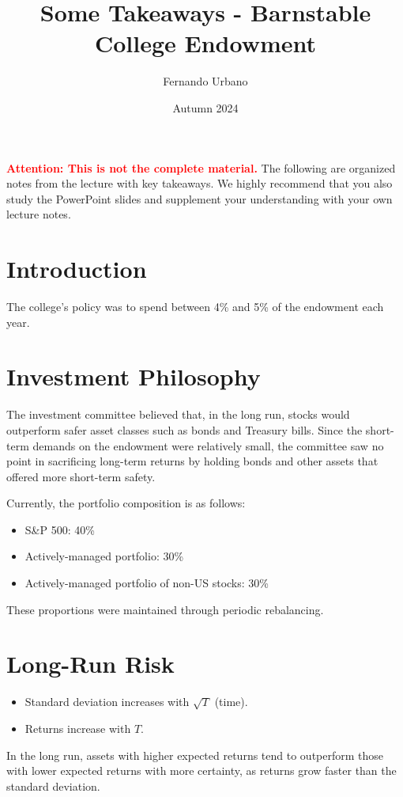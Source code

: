 \documentclass{article}
\title{Some Takeaways - Barnstable College Endowment}
\author{Fernando Urbano}
\date{Autumn 2024}
\newcommand{\redbold}[1]{\textbf{\textcolor{red}{#1}}}
\begin{document}
\maketitle

\redbold{Attention: This is not the complete material.} The following are organized notes from the lecture with key takeaways. We highly recommend that you also study the PowerPoint slides and supplement your understanding with your own lecture notes.

\section{Introduction}
The college's policy was to spend between 4\% and 5\% of the endowment each year.

\section{Investment Philosophy}
The investment committee believed that, in the long run, stocks would outperform safer asset classes such as bonds and Treasury bills. Since the short-term demands on the endowment were relatively small, the committee saw no point in sacrificing long-term returns by holding bonds and other assets that offered more short-term safety.

Currently, the portfolio composition is as follows:
\begin{itemize}
    \item S\&P 500: 40\%
    \item Actively-managed portfolio: 30\%
    \item Actively-managed portfolio of non-US stocks: 30\%
\end{itemize}

These proportions were maintained through periodic rebalancing.

\section{Long-Run Risk}
\begin{itemize}
    \item Standard deviation increases with $\sqrt{T}$ (time).
    \item Returns increase with $T$.
\end{itemize}

In the long run, assets with higher expected returns tend to outperform those with lower expected returns with more certainty, as returns grow faster than the standard deviation.
\end{document}
